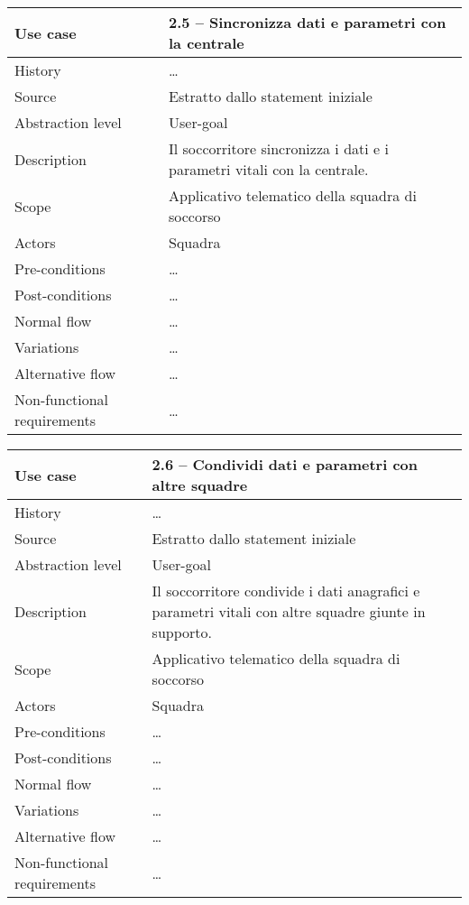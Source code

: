 \documentclass{article}
\begin{document}
    \begin{table}
        \begin{tabularx}{\textwidth}{l|X}
            Use case & 2.5 – Sincronizza dati e parametri con la centrale\\
            \hline
            History & \dots \\
            Source & Estratto dallo statement iniziale\\
            Abstraction level & User-goal\\
            Description & Il soccorritore sincronizza i dati e i parametri vitali con la centrale.\\
            Scope & Applicativo telematico della squadra di soccorso\\
            Actors & Squadra\\
            Pre-conditions & \dots \\
            Post-conditions & \dots \\
            Normal flow & \dots \\
            Variations & \dots \\
            Alternative flow & \dots \\
            Non-functional requirements & \dots
        \end{tabularx}
        \label{tab:usecase2.5}
    \end{table}

    \begin{table}
        \begin{tabularx}{\textwidth}{l|X}
            Use case & 2.6 – Condividi dati e parametri con altre squadre\\
            \hline
            History & \dots \\
            Source & Estratto dallo statement iniziale\\
            Abstraction level & User-goal\\
            Description & Il soccorritore condivide i dati anagrafici e parametri vitali con altre squadre giunte in supporto.\\
            Scope & Applicativo telematico della squadra di soccorso\\
            Actors & Squadra\\
            Pre-conditions & \dots \\
            Post-conditions & \dots \\
            Normal flow & \dots \\
            Variations & \dots \\
            Alternative flow & \dots \\
            Non-functional requirements & \dots
        \end{tabularx}
        \label{tab:usecase2.6}
    \end{table}
\end{document}
